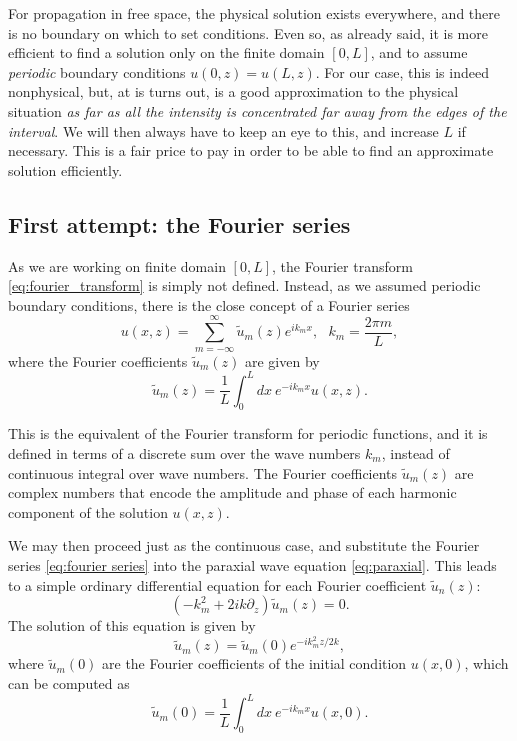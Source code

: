 \documentclass[a4paper,10pt]{report}
\begin{document}
For propagation in free space, the physical solution exists everywhere, and there is no boundary on which to set conditions. Even so, as already said, it is more efficient to find a solution only on the finite domain $[0,L]$, and to assume \textit{periodic} boundary conditions $u(0,z) = u(L,z)$. For our case, this is indeed nonphysical, but, at is turns out, is a good approximation to the physical situation \textit{as far as all the intensity is concentrated far away from the edges of the interval}. We will then always have to keep an eye to this, and increase $L$ if necessary. This is a fair price to pay in order to be able to find an approximate solution efficiently.

\subsection{First attempt: the Fourier series}

As we are working on finite domain $[0,L]$, the Fourier transform \eqref{eq:fourier_transform} is simply not defined. Instead, as we assumed periodic boundary conditions, there is the close concept of a Fourier series
\begin{equation}
    \label{eq:fourier series}
    u(x,z) = \sum_{m=-\infty}^{\infty} \tilde{u}_m(z) e^{i k_m x}, \ \ \ k_m = \frac{2\pi m}{L},
\end{equation}
where the Fourier coefficients $\tilde{u}_m(z)$ are given by
\begin{equation}
    \tilde{u}_m(z) = \frac{1}{L} \int_0^L dx \ e^{-i k_m x} u(x,z).
\end{equation}

This is the equivalent of the Fourier transform for periodic functions, and it is defined in terms of a discrete sum over the wave numbers $k_m$, instead of continuous integral over wave numbers. The Fourier coefficients $\tilde{u}_m(z)$ are complex numbers that encode the amplitude and phase of each harmonic component of the solution $u(x,z)$.

We may then proceed just as the continuous case, and substitute the Fourier series \eqref{eq:fourier series} into the paraxial wave equation \eqref{eq:paraxial}. This leads to a simple ordinary differential equation for each Fourier coefficient $\tilde{u}_n(z)$:
\begin{equation}
    \left( -k_m^2 + 2ik \partial_z \right) \tilde{u}_m(z) = 0.
\end{equation}
The solution of this equation is given by
\begin{equation}
    \label{eq:solution_paraxial_fourier_discrete}
    \tilde{u}_m(z) = \tilde{u}_m(0) e^{-i k_m^2 z / 2k},
\end{equation}
where $\tilde{u}_m(0)$ are the Fourier coefficients of the initial condition $u(x,0)$, which can be computed as
\begin{equation}
    \tilde{u}_m(0) = \frac{1}{L} \int_0^L dx \ e^{-i k_m x} u(x,0).
\end{equation}
\end{document}
